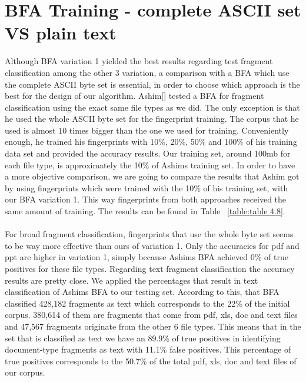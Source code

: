 \section{BFA Training - complete ASCII set VS plain text }
Although BFA variation 1 yielded the best results regarding test fragment classification among the other 3 variation, a comparison with a BFA which use the complete ASCII byte set is essential, in order to choose which approach is the best for the design of our algorithm. Ashim[] tested a BFA for fragment classification using the exact same file types as we did. The only exception is that he used the whole ASCII byte set for the fingerprint training. The corpus that he used is almost 10 times bigger than the one we used for training. Conveniently enough, he trained his fingerprints with 10\%, 20\%, 50\% and 100\% of his training data set and provided the accuracy results. Our training set, around 100mb for each file type, is approximately the 10\% of Ashims training set. In order to have a more objective comparison, we are going to compare the results that Ashim got by using fingerprints which were trained with the 10\% of his training set, with our BFA variation 1. This way fingerprints from both approaches received the same amount of training. The results can be found in Table ~\ref{table:table 4.8}.\\\\ 
  
 For broad fragment classification, fingerprints that use the whole byte set seems to be way more effective than ours of variation 1. Only the accuracies for pdf and ppt are higher in variation 1, simply because Ashims BFA achieved 0\% of true positives for these file types. Regarding text fragment classification the accuracy results are pretty close. We applied the percentages that result in text classification of Ashims BFA to our testing set. According to this, that BFA classified 428,182 fragments as text which corresponds to the 22\% of the initial corpus. 380,614 of them are fragments that come from pdf, xls, doc and text files and 47,567 fragments originate from the other 6 file types. This means that in the set that is classified as text we have an 89.9\% of true positives in identifying document-type fragments as text with 11.1\% false positives. This percentage of true positives corresponds to the 50.7\% of the total pdf, xls, doc and text files of our corpus.\\\\
 
